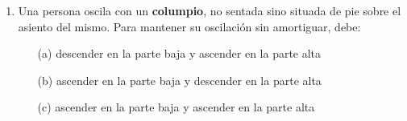 \documentclass[11pt]{articulo}
\begin{document}
\begin{enumerate}
\item  Una persona oscila con un {\bf columpio},  no sentada sino situada de pie sobre el asiento del mismo.
Para mantener su oscilaci\'on sin amortiguar, debe:
\begin{enumerate}
\item[(a)] \fbox{$\, \phantom{-}\, $} \hspace*{1cm}   descender en la parte baja y ascender en la parte alta
\item[(b)] \fbox{$\, \phantom{-}\, $} \hspace*{1cm}   ascender en la parte baja y descender en la parte alta  %
\item[(c)] \fbox{$\, \phantom{-}\, $} \hspace*{1cm}   ascender en la parte baja y ascender en la parte alta
\end{enumerate}

\end{enumerate}    
	
\end{document}
